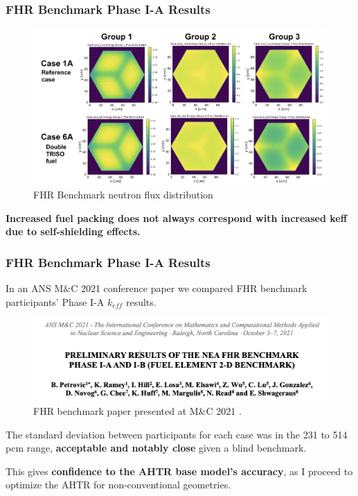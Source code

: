 \begin{frame}
    \frametitle{FHR Benchmark Phase I-A Results}
    \begin{figure}
        \centering
        \includegraphics[width=\linewidth]{figures/phase1a-flux.png} 
        \vspace{-0.5cm}
        \caption{FHR Benchmark neutron flux distribution}
    \end{figure}
    \vspace{-0.3cm}
    \textbf{Increased fuel packing does not always correspond with increased keff 
    due to self-shielding effects.}
\end{frame}

\begin{frame}
    \frametitle{FHR Benchmark Phase I-A Results}
    In an ANS M$\&$C 2021 conference paper we compared FHR benchmark participants' 
    Phase I-A $k_{eff}$ results. 
    \begin{figure}[]
        \centering
        \includegraphics[width=0.85\linewidth]{figures/mnc.png} 
        \caption{FHR benchmark paper presented at M$\&$C 2021 
        \cite{petrovic_preliminary_2021}.}
    \end{figure}

    The standard deviation between participants for each case was in the 231 to 514 
    pcm range, \textbf{acceptable and notably close} given a blind benchmark.

    \vspace{0.2cm}
    This gives \textbf{confidence to the AHTR base model's accuracy}, as I 
    proceed to optimize the AHTR for non-conventional geometries. 
\end{frame}
